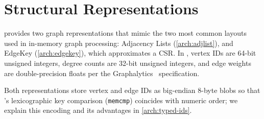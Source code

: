 \section{Structural Representations}
\label{arch:structural-reps}



\project{} provides two graph representations that mimic the two most common layouts used in in-memory graph processing: Adjacency Lists (\autoref{arch:adjlist}), and EdgeKey (\autoref{arch:edgekey}), which approximates a CSR.
In \project{}, vertex IDs are 64-bit unsigned integers, degree counts are 32-bit unsigned integers, and edge weights are double-precision floats per the Graphalytics~\cite{capotua2015graphalytics} specification.

Both representations store vertex and edge IDs as big-endian 8-byte blobs so that \wt{}'s lexicographic key comparison (\texttt{memcmp}) coincides with numeric order; we explain this encoding and its advantages in \autoref{arch:typed-ids}.

